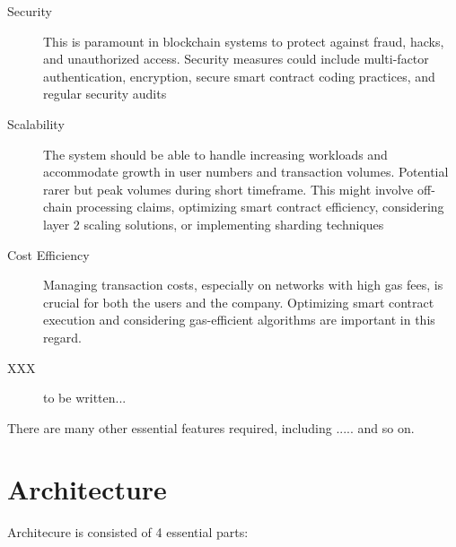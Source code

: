 \documentclass[12pt,oneside]{article}
\begin{document}
\begin{description}
  \item[Security]
  This is paramount in blockchain systems to protect against fraud, hacks,
   and unauthorized access. Security measures could include multi-factor authentication, 
  encryption, secure smart contract coding practices, and regular security audits

  \item[Scalability]
  The system should be able to handle increasing workloads and 
  accommodate growth in user numbers and transaction volumes. Potential rarer but peak volumes during short timeframe.  
  This might involve off-chain processing claims, optimizing smart contract efficiency,
  considering layer 2 scaling solutions, or implementing sharding techniques

  \item[Cost Efficiency]
  Managing transaction costs, especially on networks with high gas fees, 
  is crucial for both the users and the company. 
  Optimizing smart contract execution and considering gas-efficient 
  algorithms are important in this regard.

  \item[XXX]
  to be written...

\end{description}

There are many other essential features required, including
..... and so on.

\section{Architecture}

Architecure is consisted of 4 essential parts:

\end{document}

